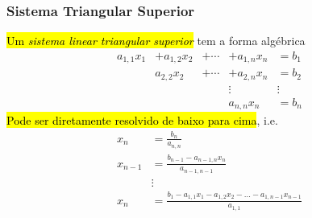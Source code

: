 \subsubsection{Sistema Triangular Superior}

\hl{Um \emph{sistema linear triangular superior}} tem a forma algébrica
\begin{equation}
  \begin{matrix}
    a_{1,1}x_1 &+ a_{1,2}x_2 &+ \cdots &+ a_{1,n}x_n &= b_1\\
              &a_{2,2}x_2  &+ \cdots &+ a_{2,n}x_{n} &= b_2\\
              &&& \vdots  &\vdots \\
              &&& a_{n,n}x_n &= b_n
  \end{matrix}
\end{equation}
\hl{Pode ser diretamente resolvido de baixo para cima}, i.e.
\begin{align}
  x_n &= \frac{b_n}{a_{n,n}}\\
  x_{n-1} &= \frac{b_{n-1} - a_{n-1,n}x_n}{a_{n-1,n-1}}\\
      &\vdots\\
  x_n &= \frac{b_1 - a_{1,1}x_1 - a_{1,2}x_2 - \ldots - a_{1,n-1}x_{n-1}}{a_{1,1}}
\end{align}

